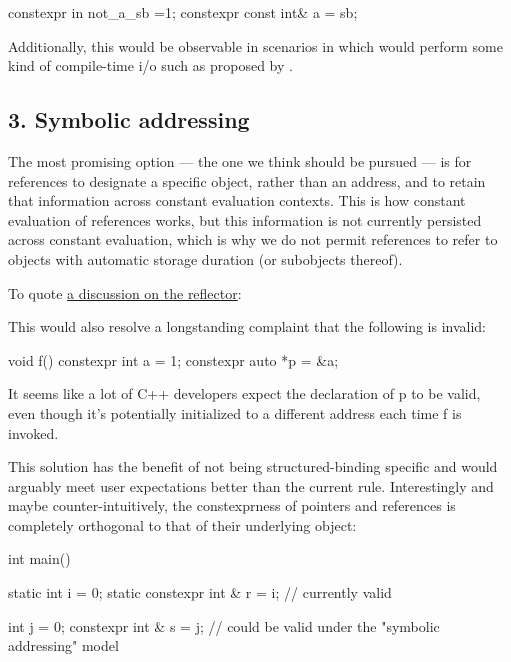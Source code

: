 \documentclass{wg21}
\begin{document}
\begin{colorblock}
constexpr in not_a_sb =1;
constexpr const int&  a = sb;
\end{colorblock}

Additionally, this would be observable in scenarios in which  would perform some kind of compile-time i/o such as proposed by .

\subsection{3. Symbolic addressing}

The most promising option --- the one we think should be pursued --- is for  references to designate a specific object, rather than an address,
and to retain that information across constant evaluation contexts.
This is how constant evaluation of references works, but this information is not currently persisted across constant evaluation, which is why we do not permit
 references to refer to objects with automatic storage duration (or subobjects thereof).

To quote \href{https://lists.isocpp.org/core/2023/04/14163.php}{a discussion on the reflector}:

\begin{quoteblock}
This would also resolve a longstanding complaint that the following is invalid:
\begin{colorblock}
void f() {
    constexpr int a = 1;
    constexpr auto *p = &a;
}
\end{colorblock}

It seems like a lot of C++ developers expect the declaration of p to be valid, even though it's potentially initialized to a different address each time f is invoked.
\end{quoteblock}

This solution has the benefit of not being structured-binding specific and would arguably meet user expectations better than the current rule.
Interestingly and maybe counter-intuitively, the constexprness of pointers and references is completely orthogonal to that of their underlying object:

\begin{colorblock}
int main() {
    static int i = 0;
    static constexpr int & r = i; // currently valid

    int j = 0;
    constexpr int & s = j; // could be valid under the "symbolic addressing" model
}
\end{colorblock}
\end{document}
